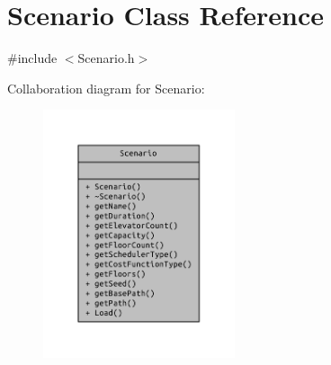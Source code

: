 \section{Scenario Class Reference}
\label{class_scenario}


{\ttfamily \#include $<$Scenario.\+h$>$}



Collaboration diagram for Scenario\+:
\nopagebreak
\begin{figure}[H]
\begin{center}
\leavevmode
\includegraphics[width=160pt]{class_scenario__coll__graph}
\end{center}
\end{figure}
